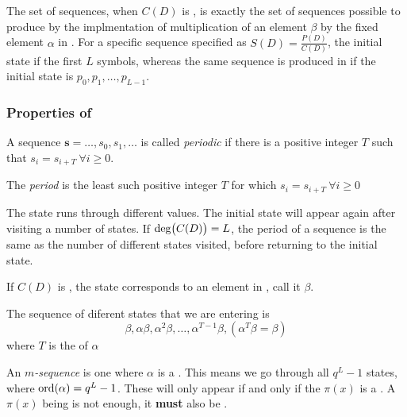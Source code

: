 \begin{blackbox}
  The set of  sequences, when $C(D)$ is , is exactly the set of sequences possible to produce by the implmentation of multiplication of an element $\beta$ by the fixed element $\alpha$ in .
  \tcblower{}
  For a specific sequence specified as $S(D) = \frac{P(D)}{C(D)}$, the initial state if the first $L$ symbols, whereas the same sequence is produced in  if the initial state is $p_{0}, p_{1}, \ldots, p_{L-1}$.
\end{blackbox}

\subsubsection{Properties of }\label{subsubsec:LFSR_Properties}
\begin{propertylist}
\item A sequence $\mathbf{s} = \ldots, s_{0}, s_{1}, \ldots$ is called \emph{periodic} if there is a positive integer $T$ such that $s_{i} = s_{i+T} \: \forall i \geq 0$.
\item The \emph{period} is the least such positive integer $T$ for which $s_{i} = s_{i+T} \: \forall i \geq 0$
\item The  state runs through different values. The initial state will appear again after visiting a number of states.
  If $\operatorname{\operatorname{deg}} \bigl( C(D) \bigr) = L$, the period of a sequence is the same as the number of different states visited, before returning to the initial state.
\item If $C(D)$ is , the state corresponds to an element in , call it $\beta$.
\item The sequence of diferent states that we are entering is
  \begin{equation*}
    \beta, \alpha\beta, \alpha^{2}\beta , \ldots, \alpha^{T-1}\beta, \left( \alpha^{T}\beta = \beta \right)
  \end{equation*}
  where $T$ is the  of $\alpha$
\end{propertylist}

\begin{definition}[$m$-Sequence]\label{def:M_Sequence}
  An \emph{$m$-sequence} is one where $\alpha$ is a .
  This means we go through all $q^{L}-1$ states, where $\operatorname{\operatorname{ord}}(\alpha) = q^{L}-1$.
  These will only appear if and only if the  $\pi(x)$ is a .
  A $\pi(x)$ being  is not enough, it \textbf{must} also be .
\end{definition}

